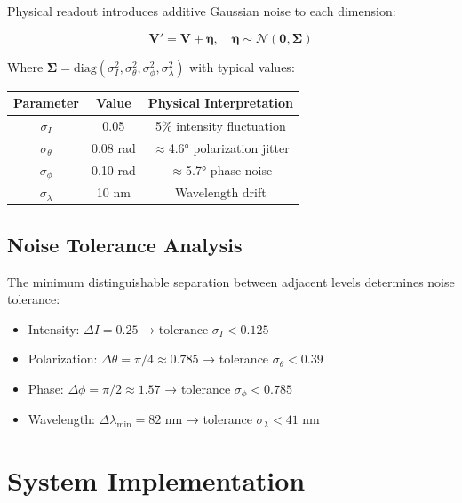 \documentclass[11pt,a4paper]{article}
\begin{document}
Physical readout introduces additive Gaussian noise to each dimension:

\begin{equation}
    \mathbf{V}' = \mathbf{V} + \bm{\eta}, \quad \bm{\eta} \sim \mathcal{N}(\mathbf{0}, \bm{\Sigma})
\end{equation}

Where $\bm{\Sigma} = \text{diag}(\sigma_I^2, \sigma_\theta^2, \sigma_\phi^2, \sigma_\lambda^2)$ with typical values:

\begin{center}
\begin{tabular}{ccc}
\toprule
Parameter & Value & Physical Interpretation \\
\midrule
$\sigma_I$ & 0.05 & 5\% intensity fluctuation \\
$\sigma_\theta$ & 0.08 rad & $\approx$4.6° polarization jitter \\
$\sigma_\phi$ & 0.10 rad & $\approx$5.7° phase noise \\
$\sigma_\lambda$ & 10 nm & Wavelength drift \\
\bottomrule
\end{tabular}
\end{center}

\subsection{Noise Tolerance Analysis}

The minimum distinguishable separation between adjacent levels determines noise tolerance:

\begin{itemize}
    \item Intensity: $\Delta I = 0.25$ → tolerance $\sigma_I < 0.125$
    \item Polarization: $\Delta\theta = \pi/4 \approx 0.785$ → tolerance $\sigma_\theta < 0.39$
    \item Phase: $\Delta\phi = \pi/2 \approx 1.57$ → tolerance $\sigma_\phi < 0.785$
    \item Wavelength: $\Delta\lambda_{\min} = 82$ nm → tolerance $\sigma_\lambda < 41$ nm
\end{itemize}

\section{System Implementation}
\end{document}
